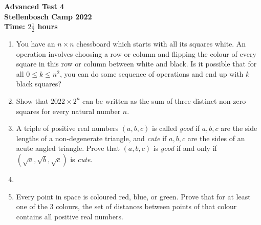 \documentclass{article}
\begin{document}
\thispagestyle{empty}

\begin{center}
  \textbf{\Large Advanced Test 4}
  \\ \vspace{1em}
  \textbf{\large Stellenbosch Camp 2022}
  \\ \vspace{1em}
  \textbf{\large Time: $2\frac{1}{2}$ hours}
\end{center}

\bigskip

\begin{enumerate}[itemsep=\fill]

\item %
You have an $n\times n$ chessboard which starts with all its squares white. An operation involves choosing a row or column and flipping the colour of every square in this row or column between white and black. Is it possible that for all $0\leq k\leq n^2$, you can do some sequence of operations and end up with $k$ black squares?


\item %
Show that $2022 \times 2^n$ can be written as the sum of three distinct non-zero squares for every natural number $n$.


\item %
A triple of positive real numbers $(a,b,c)$ is called \textit{good} if $a,b,c$ are the side lengths of a non-degenerate triangle, and \textit{cute} if $a,b,c$ are the sides of an acute angled triangle. Prove that $(a,b,c)$ is \textit{good} if and only if $(\sqrt{a},\sqrt{b},\sqrt{c})$ is \textit{cute}. 


\item %


\item %
Every point in space is coloured red, blue, or green. Prove that for at least one of the 3 colours, the set of distances between points of that colour contains all positive real numbers.


\end{enumerate}
\end{document}
